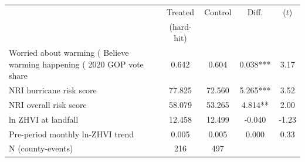 \begin{tabular}{p{6.2cm}cccc}
\toprule
& Treated & Control & Diff. & ($t$) \\
& (hard-hit) & & & \\
\midrule
Worried about warming (%
Believe warming happening (%
2020 GOP vote share & 0.642 & 0.604 & 0.038*** & 3.17 \\
NRI hurricane risk score & 77.825 & 72.560 & 5.265*** & 3.52 \\
NRI overall risk score & 58.079 & 53.265 & 4.814** & 2.00 \\
ln ZHVI at landfall & 12.458 & 12.499 & -0.040 & -1.23 \\
Pre-period monthly ln-ZHVI trend & 0.005 & 0.005 & 0.000 & 0.33 \\
N (county-events) & 216 & 497 & & \\
\bottomrule
\end{tabular}